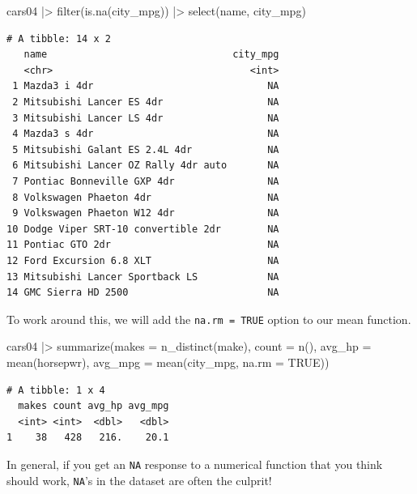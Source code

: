 \documentclass[
  letterpaper,
]{book}
\newenvironment{Shaded}{\begin{snugshade}}{\end{snugshade}}
\newcommand{\AttributeTok}[1]{\textcolor[rgb]{0.40,0.45,0.13}{#1}}
\newcommand{\ConstantTok}[1]{\textcolor[rgb]{0.56,0.35,0.01}{#1}}
\newcommand{\FunctionTok}[1]{\textcolor[rgb]{0.28,0.35,0.67}{#1}}
\newcommand{\NormalTok}[1]{\textcolor[rgb]{0.00,0.23,0.31}{#1}}
\newcommand{\SpecialCharTok}[1]{\textcolor[rgb]{0.37,0.37,0.37}{#1}}
\begin{document}
\begin{Shaded}
\begin{Highlighting}[]
\NormalTok{cars04 }\SpecialCharTok{|\textgreater{}} 
  \FunctionTok{filter}\NormalTok{(}\FunctionTok{is.na}\NormalTok{(city\_mpg)) }\SpecialCharTok{|\textgreater{}} 
  \FunctionTok{select}\NormalTok{(name, city\_mpg)}
\end{Highlighting}
\end{Shaded}

\begin{verbatim}
# A tibble: 14 x 2
   name                                city_mpg
   <chr>                                  <int>
 1 Mazda3 i 4dr                              NA
 2 Mitsubishi Lancer ES 4dr                  NA
 3 Mitsubishi Lancer LS 4dr                  NA
 4 Mazda3 s 4dr                              NA
 5 Mitsubishi Galant ES 2.4L 4dr             NA
 6 Mitsubishi Lancer OZ Rally 4dr auto       NA
 7 Pontiac Bonneville GXP 4dr                NA
 8 Volkswagen Phaeton 4dr                    NA
 9 Volkswagen Phaeton W12 4dr                NA
10 Dodge Viper SRT-10 convertible 2dr        NA
11 Pontiac GTO 2dr                           NA
12 Ford Excursion 6.8 XLT                    NA
13 Mitsubishi Lancer Sportback LS            NA
14 GMC Sierra HD 2500                        NA
\end{verbatim}

To work around this, we will add the \texttt{na.rm\ =\ TRUE} option to
our mean function.

\begin{Shaded}
\begin{Highlighting}[]
\NormalTok{cars04 }\SpecialCharTok{|\textgreater{}} 
  \FunctionTok{summarize}\NormalTok{(}\AttributeTok{makes =} \FunctionTok{n\_distinct}\NormalTok{(make),}
            \AttributeTok{count =} \FunctionTok{n}\NormalTok{(),}
            \AttributeTok{avg\_hp =} \FunctionTok{mean}\NormalTok{(horsepwr),}
            \AttributeTok{avg\_mpg =} \FunctionTok{mean}\NormalTok{(city\_mpg, }\AttributeTok{na.rm =} \ConstantTok{TRUE}\NormalTok{))}
\end{Highlighting}
\end{Shaded}

\begin{verbatim}
# A tibble: 1 x 4
  makes count avg_hp avg_mpg
  <int> <int>  <dbl>   <dbl>
1    38   428   216.    20.1
\end{verbatim}

In general, if you get an \texttt{NA} response to a numerical function
that you think should work, \texttt{NA}'s in the dataset are often the
culprit!
\end{document}
